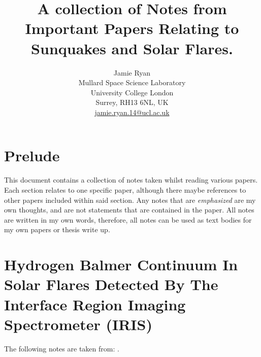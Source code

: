 \documentclass[11pt]{article}
\title{A collection of Notes from Important Papers Relating to Sunquakes and Solar Flares.}
\author{Jamie Ryan \\
Mullard Space Science Laboratory \\
University College London \\
Surrey, RH13 6NL, UK\\
\href{mailto:jamie.ryan.14@ucl.ac.uk}{jamie.ryan.14@ucl.ac.uk}
\date{}}
\begin{document}
\maketitle
\tableofcontents

\section{Prelude}
This document contains a collection of notes taken whilst reading various papers. Each section relates to one specific paper, although there maybe references to other papers included within said section. Any notes that are \emph{emphasized} are my own thoughts, and are not statements that are contained in the paper. All notes are written in my own words, therefore, all notes can be used as text bodies for my own papers or thesis write up.


\section{Hydrogen Balmer Continuum In Solar Flares Detected By The Interface Region Imaging Spectrometer (IRIS)}
The following notes are taken from: \cite{2014ApJ...794L..23H,}. \\
\end{document}
